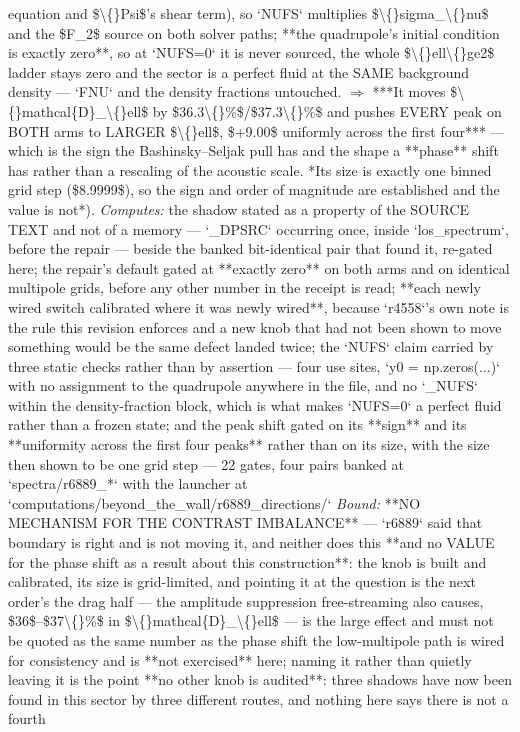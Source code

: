 \begin{description}
equation and \$\textbackslash\{\}Psi\$'s shear term), so `NUFS` multiplies \$\textbackslash\{\}sigma\_\textbackslash\{\}nu\$ and the \$F\_2\$ source on both solver paths; **the quadrupole's initial condition is exactly zero**, so at `NUFS=0` it is never sourced, the whole \$\textbackslash\{\}ell\textbackslash\{\}ge2\$ ladder stays zero and the sector is a perfect fluid at the SAME background density --- `FNU` and the density fractions untouched. \ensuremath{\Rightarrow} ***It moves \$\textbackslash\{\}mathcal\{D\}\_\textbackslash\{\}ell\$ by \$36.3\textbackslash\{\}\%\$/\$37.3\textbackslash\{\}\%\$ and pushes EVERY peak on BOTH arms to LARGER \$\textbackslash\{\}ell\$, \$+9.00\$ uniformly across the first four*** --- which is the sign the Bashinsky--Seljak pull has and the shape a **phase** shift has rather than a rescaling of the acoustic scale.  *Its size is exactly one binned grid step (\$8.9999\$), so the sign and order of magnitude are established and the value is not*). 
\emph{Computes:} the shadow stated as a property of the SOURCE TEXT and not of a memory --- `\_DPSRC` occurring once, inside `los\_spectrum`, before the repair --- beside the banked bit-identical pair that found it, re-gated here; the repair's default gated at **exactly zero** on both arms and on identical multipole grids, before any other number in the receipt is read; **each newly wired switch calibrated where it was newly wired**, because `r4558`'s own note is the rule this revision enforces and a new knob that had not been shown to move something would be the same defect landed twice; the `NUFS` claim carried by three static checks rather than by assertion --- four use sites, `y0 = np.zeros(...)` with no assignment to the quadrupole anywhere in the file, and no `\_NUFS` within the density-fraction block, which is what makes `NUFS=0` a perfect fluid rather than a frozen state; and the peak shift gated on its **sign** and its **uniformity across the first four peaks** rather than on its size, with the size then shown to be one grid step --- 22 gates, four pairs banked at `spectra/r6889\_*` with the launcher at `computations/beyond\_the\_wall/r6889\_directions/`
 \emph{Bound:}  **NO MECHANISM FOR THE CONTRAST IMBALANCE** --- `r6889` said that boundary is right and is not moving it, and neither does this  **and no VALUE for the phase shift as a result about this construction**: the knob is built and calibrated, its size is grid-limited, and pointing it at the question is the next order's  the drag half --- the amplitude suppression free-streaming also causes, \$36\$--\$37\textbackslash\{\}\%\$ in \$\textbackslash\{\}mathcal\{D\}\_\textbackslash\{\}ell\$ --- is the large effect and must not be quoted as the same number as the phase shift  the low-multipole path is wired for consistency and is **not exercised** here; naming it rather than quietly leaving it is the point  **no other knob is audited**: three shadows have now been found in this sector by three different routes, and nothing here says there is not a fourth

\end{description}

